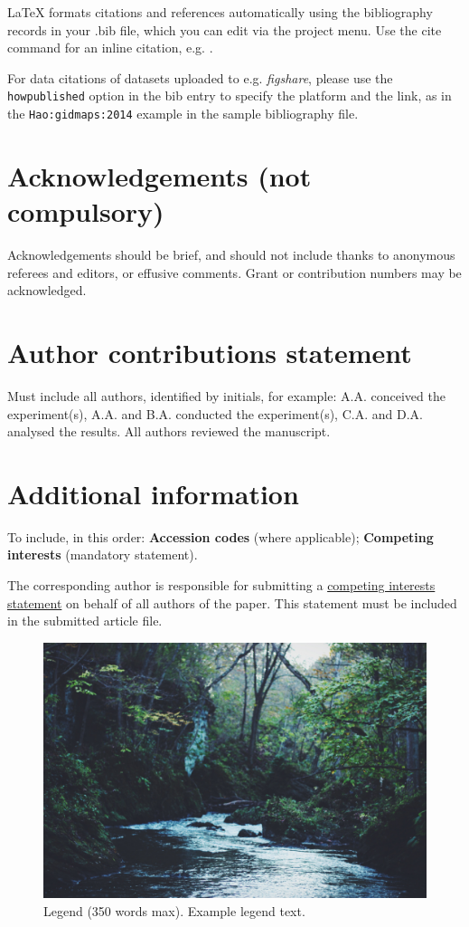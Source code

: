 \documentclass[fleqn,10pt]{wlscirep}
\begin{document}


\noindent LaTeX formats citations and references automatically using the bibliography records in your .bib file, which you can edit via the project menu. Use the cite command for an inline citation, e.g.  \cite{Hao:gidmaps:2014}.

For data citations of datasets uploaded to e.g. \emph{figshare}, please use the \verb|howpublished| option in the bib entry to specify the platform and the link, as in the \verb|Hao:gidmaps:2014| example in the sample bibliography file.

\section*{Acknowledgements (not compulsory)}

Acknowledgements should be brief, and should not include thanks to anonymous referees and editors, or effusive comments. Grant or contribution numbers may be acknowledged.

\section*{Author contributions statement}

Must include all authors, identified by initials, for example:
A.A. conceived the experiment(s),  A.A. and B.A. conducted the experiment(s), C.A. and D.A. analysed the results.  All authors reviewed the manuscript. 

\section*{Additional information}

To include, in this order: \textbf{Accession codes} (where applicable); \textbf{Competing interests} (mandatory statement). 

The corresponding author is responsible for submitting a \href{http://www.nature.com/srep/policies/index.html#competing}{competing interests statement} on behalf of all authors of the paper. This statement must be included in the submitted article file.

\begin{figure}[ht]
\centering
\includegraphics[width=\linewidth]{stream}
\caption{Legend (350 words max). Example legend text.}
\label{fig:stream}
\end{figure}
\end{document}
